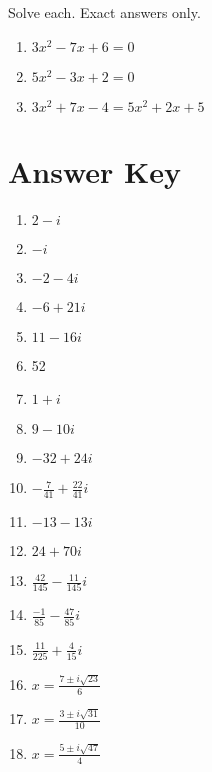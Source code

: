 Solve each. Exact answers only.

\begin{multicols}{3}
\begin{enumerate}		\setcounter{enumi}{\value{Review}}
	\item $3x^2-7x+6=0$
	\item $5x^2-3x+2=0$
	\item $3x^2+7x-4=5x^2+2x+5$
\end{enumerate}	\setcounter{Review}{\value{enumi}}
\end{multicols}


\newpage

\section{Answer Key}

\begin{enumerate}
	\item $2-i$
    \item $-i$
    \item $-2-4i$
    \item $-6+21i$
    \item $11-16i$
    \item 52
    \item $1 + i$
    \item $9-10i$
    \item $-32+24i$
    \item $-\frac{7}{41}+\frac{22}{41}i$
    \item $-13-13i$
    \item $24+70i$
    \item $\frac{42}{145}-\frac{11}{145}i$
    \item $\frac{-1}{85}-\frac{47}{85}i$
    \item $\frac{11}{225} + \frac{4}{15}i$
    
    \item $x = \frac{7 \pm i\sqrt{23}}{6}$
    \item $x = \frac{3 \pm i \sqrt{31}}{10}$
    \item $x = \frac{5 \pm i\sqrt{47}}{4}$
\end{enumerate}